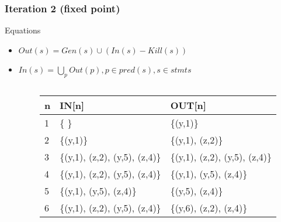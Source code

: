 \begin{frame}[fragile, t]
	\frametitle{Iteration 2 (fixed point)} 
	
	\begin{center}
		\begin{scriptsize}
			\begin{minipage}{8cm}
				\begin{block}{Equations}
					\begin{itemize}
						\item $Out(s) = Gen(s) \cup (In(s) - Kill(s))$  
						\item $In(s) = \bigcup_p Out(p), p \in pred(s), s \in stmts$
					\end{itemize}
				\end{block}
			\end{minipage}
		\end{scriptsize}
	\end{center}
	
	\begin{columns}[T]
		\begin{column}[T]{.3\textwidth}
			\vspace{0pt}
			
		\end{column}
		\begin{column}[T]{.7\textwidth}
			\vspace{0pt}    
			\begin{scriptsize}
				\begin{table}[]
					\begin{tabular}{|l|l|l|}
						\hline
						n & IN{[}n{]} & OUT{[}n{]} \\ \hline
						1  & \{ \} & \{(y,1)\} \pause \\ \hline
						2  & \{(y,1)\} & \{(y,1), (z,2)\} \pause \\ \hline
						3  & \{(y,1), (z,2), (y,5), (z,4)\} & \{(y,1), (z,2), (y,5), (z,4)\} \pause \\ \hline
						4  & \{(y,1), (z,2), (y,5), (z,4)\} & \{(y,1), (y,5), (z,4)\} \pause \\ \hline
						5  & \{(y,1), (y,5), (z,4)\} & \{(y,5), (z,4)\} \pause \\ \hline
						6  & \{(y,1), (z,2), (y,5), (z,4)\} & \{(y,6), (z,2), (z,4)\} \\ \hline
					\end{tabular}
				\end{table}   
			\end{scriptsize}
		\end{column}
		
	\end{columns}
	
\end{frame}   